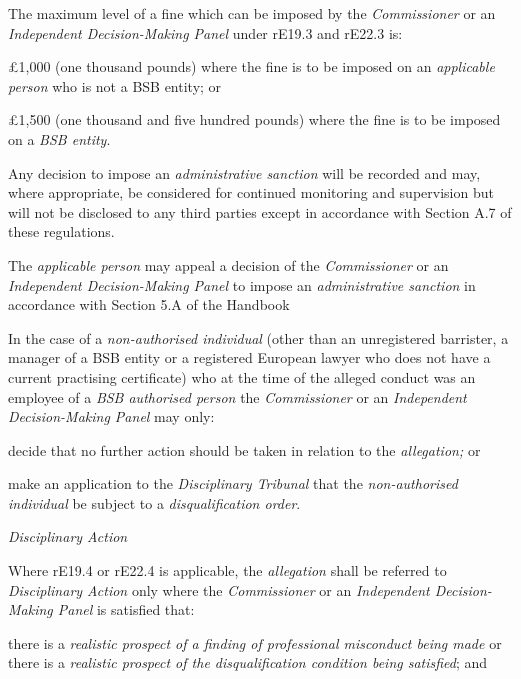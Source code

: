 \par
The maximum level of a fine which can be imposed by
the \emph{Commissioner }or an \emph{Independent Decision-Making
Panel }under rE19.3 and rE22.3 is:\\\nl \item £1,000 (one thousand pounds) where the fine is to be imposed on
an \emph{applicable person} who is not a BSB entity; or\item £1,500 (one thousand and five hundred pounds) where the fine is to be
imposed on a \emph{BSB entity}.\ln
{}\par
Any decision to impose an \emph{administrative sanction} will be
recorded and may, where appropriate, be considered for continued
monitoring and supervision but will not be disclosed to any third
parties except in accordance with Section A.7 of these regulations.\\
\par
The \emph{applicable person} may appeal a decision of
the \emph{Commissioner }or an \emph{Independent Decision-Making
Panel }to impose an \emph{administrative sanction} in accordance with
Section 5.A of the Handbook\\
\par
In the case of a \emph{non-authorised individual} (other than an
unregistered barrister, a manager of a BSB entity or a registered
European lawyer who does not have a current practising certificate) who
at the time of the alleged conduct was an employee of a \emph{BSB
authorised person} the \emph{Commissioner }or an \emph{Independent
Decision-Making Panel }may only:\\\nl \item decide that no further action should be taken in relation to
the \emph{allegation;} or\item make an application to the \emph{Disciplinary Tribunal} that
the \emph{non-authorised individual} be subject to
a \emph{disqualification order}.\ln
{}\par
\emph{Disciplinary Action}\par
{}\par
Where rE19.4 or rE22.4 is applicable, the \emph{allegation} shall be
referred to \emph{Disciplinary Action} only where
the \emph{Commissioner }or an \emph{Independent Decision-Making
Panel }is satisfied that:\\\nl \item there is a \emph{realistic prospect of a finding of professional
misconduct being made} or there is a \emph{realistic prospect of the
disqualification condition being satisfied}; and
